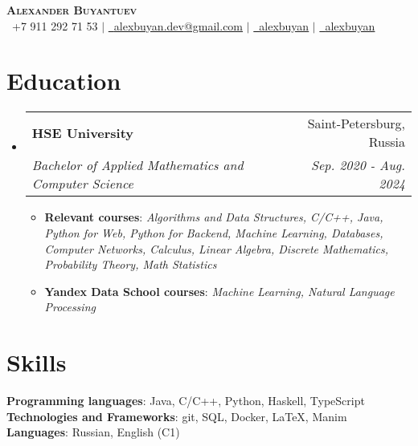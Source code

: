 \documentclass[english,russian,letterpaper,11pt]{article}
\makeatletter
\newcommand{\resumeItem}[1]{
  \item\small{
    {#1 \vspace{-2pt}}
  }
}
\newcommand{\resumeSubheading}[4]{
  \vspace{-2pt}\item
    \begin{tabular*}{0.97\textwidth}[t]{l@{\extracolsep{\fill}}r}
      \textbf{#1} & #2 \\
      \textit{\small#3} & \textit{\small #4} \\
    \end{tabular*}\vspace{-7pt}
}
\newcommand{\resumeSubHeadingListStart}{\begin{itemize}[leftmargin=0.15in, label={}]}
\newcommand{\resumeSubHeadingListEnd}{\end{itemize}}
\newcommand{\resumeItemListStart}{\begin{itemize}}
\newcommand{\resumeItemListEnd}{\end{itemize}\vspace{-5pt}}
\makeatother
\begin{document}

\begin{center}
    \textbf{\Huge \scshape Alexander Buyantuev} \\ \vspace{2pt}
    \small \faPhone \ +7 911 292 71 53 $|$ \href{mailto:alexbuyan.dev@gmail.com}{\faEnvelope \ \underline{alexbuyan.dev@gmail.com}} $|$ 
    \href{https://github.com/alexbuyan}{\faGithub \ \underline{alexbuyan}} $|$ \href{https://www.linkedin.com/in/alexander-buyantuev-063785223}{\faLinkedin \ \underline{alexbuyan}}
\end{center}


\section{Education}
  \resumeSubHeadingListStart
    \resumeSubheading
      {HSE University}{Saint-Petersburg, Russia}
      {Bachelor of Applied Mathematics and Computer Science}{Sep. 2020 - Aug. 2024}
      \resumeItemListStart
        \resumeItem{\textbf{Relevant courses}: \textit{Algorithms and Data Structures, C/C++, Java, Python for Web, Python for Backend, Machine Learning, Databases, Computer Networks, Calculus, Linear Algebra, Discrete Mathematics, Probability Theory, Math Statistics}}
        \resumeItem{\textbf{Yandex Data School courses}: \textit{Machine Learning, Natural Language Processing}}
      \resumeItemListEnd
  \resumeSubHeadingListEnd

\section{Skills}
 \begin{itemize}[leftmargin=0.15in, label={}]
    \small{\item{
     \textbf{Programming languages}{: Java, C/C++, Python, Haskell, TypeScript} \\
     \textbf{Technologies and Frameworks}{: git, SQL, Docker, \LaTeX, Manim} \\
     \textbf{Languages}{: Russian, English (C1)} \\
    }}
 \end{itemize}
\end{document}
